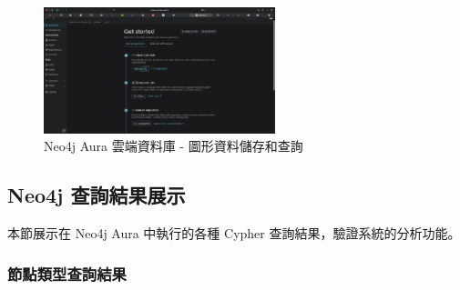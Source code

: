 \documentclass[11pt,a4paper]{ctexart}
\begin{document}
\begin{figure}[H]
\centering
\includegraphics[width=0.6\textwidth]{neo4j_aura.png}
\caption{Neo4j Aura 雲端資料庫 - 圖形資料儲存和查詢}
\label{fig:neo4j}
\end{figure}

\subsection{Neo4j 查詢結果展示}

本節展示在 Neo4j Aura 中執行的各種 Cypher 查詢結果，驗證系統的分析功能。

\subsubsection{節點類型查詢結果}
\end{document}
